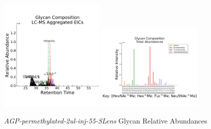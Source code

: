    \begin{figure}[!htbp]
        \centering
        \includegraphics[width=0.45\textwidth,valign=t]{figure/rp_agp_chromatograms.pdf}
        \includegraphics[width=0.45\textwidth,valign=t]{figure/rp_agp_abundances.pdf}
        \caption{\textit{AGP-permethylated-2ul-inj-55-SLens} Glycan Relative Abundances}
        \label{fig:rp_agp_aggregated_eics}
    \end{figure}


